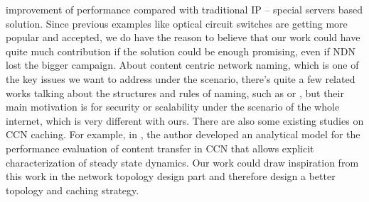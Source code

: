 improvement of performance compared with traditional IP – special servers based
solution. Since previous examples like optical circuit switches are getting more
popular and accepted, we do have the reason to believe that our work could have
quite much contribution if the solution could be enough promising, even if NDN
lost the bigger campaign.  About content centric network naming, which is one of
the key issues we want to address under the scenario, there’s quite a few
related works talking about the structures and rules of naming, such as
\cite{ghodsi2011naming} or \cite{primes}, but their main motivation is for
security or scalability under the scenario of the whole internet, which is very
different with ours.  There are also some existing studies on CCN caching. For
example, in \cite{carofiglio2011modeling}, the author developed an analytical
model for the performance evaluation of content transfer in CCN that allows
explicit characterization of steady state dynamics. Our work could draw
inspiration from this work in the network topology design part and therefore
design a better topology and caching strategy.
